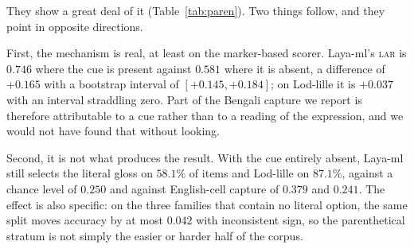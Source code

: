 \documentclass[11pt]{article}
\newcommand{\LAR}{\textsc{lar}}
\begin{document}
They show a great deal of it (Table~\ref{tab:paren}). Two things follow, and they
point in opposite directions.

First, the mechanism is real, at least on the marker-based scorer. Laya-ml's
\LAR{} is $0.746$ where the cue is present against $0.581$ where it is absent, a
difference of $+0.165$ with a bootstrap interval of $[+0.145, +0.184]$; on
Lod-lille it is $+0.037$ with an interval straddling zero. Part of the Bengali
capture we report is therefore attributable to a cue rather than to a reading of
the expression, and we would not have found that without looking.

Second, it is not what produces the result. With the cue entirely absent, Laya-ml
still selects the literal gloss on $58.1\%$ of items and Lod-lille on $87.1\%$,
against a chance level of $0.250$ and against English-cell capture of $0.379$ and
$0.241$. The effect is also specific: on the three families that contain no
literal option, the same split moves accuracy by at most $0.042$ with inconsistent
sign, so the parenthetical stratum is not simply the easier or harder half of the
corpus.
\end{document}
